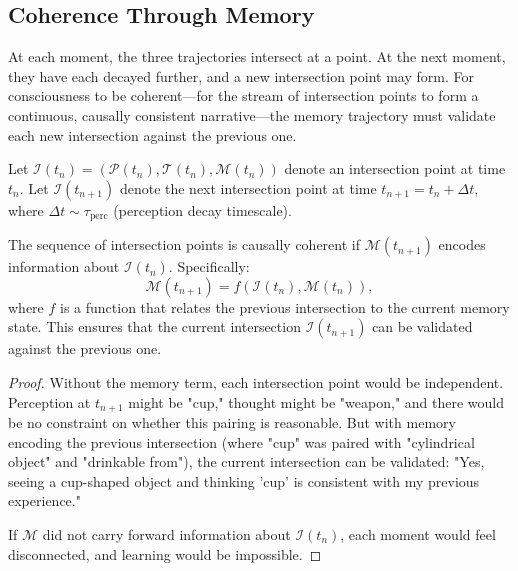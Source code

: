 \subsection{Coherence Through Memory}

At each moment, the three trajectories intersect at a point. At the next moment, they have each decayed further, and a new intersection point may form. For consciousness to be coherent—for the stream of intersection points to form a continuous, causally consistent narrative—the memory trajectory must validate each new intersection against the previous one.

\begin{theorem}
\label{thm:coherence}
Let $\mathcal{I}(t_n) = (\mathcal{P}(t_n), \mathcal{T}(t_n), \mathcal{M}(t_n))$ denote an intersection point at time $t_n$. Let $\mathcal{I}(t_{n+1})$ denote the next intersection point at time $t_{n+1} = t_n + \Delta t$, where $\Delta t \sim \tau_{\text{perc}}$ (perception decay timescale).

The sequence of intersection points is causally coherent if $\mathcal{M}(t_{n+1})$ encodes information about $\mathcal{I}(t_n)$. Specifically:
\begin{equation}
\mathcal{M}(t_{n+1}) = f(\mathcal{I}(t_n), \mathcal{M}(t_n)),
\end{equation}
where $f$ is a function that relates the previous intersection to the current memory state. This ensures that the current intersection $\mathcal{I}(t_{n+1})$ can be validated against the previous one.
\end{theorem}

\begin{proof}
Without the memory term, each intersection point would be independent. Perception at $t_{n+1}$ might be "cup," thought might be "weapon," and there would be no constraint on whether this pairing is reasonable. But with memory encoding the previous intersection (where "cup" was paired with "cylindrical object" and "drinkable from"), the current intersection can be validated: "Yes, seeing a cup-shaped object and thinking 'cup' is consistent with my previous experience."

If $\mathcal{M}$ did not carry forward information about $\mathcal{I}(t_n)$, each moment would feel disconnected, and learning would be impossible.
\end{proof}

